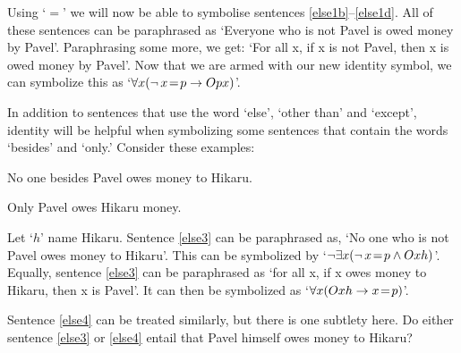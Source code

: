 Using `$=$' we will now be able to symbolise sentences \ref{else1b}--\ref{else1d}. All of these sentences can be  paraphrased as `Everyone who is not Pavel is owed money by Pavel'. Paraphrasing some more, we get: `For all x, if x is not Pavel, then x is owed money by Pavel'. Now that we are armed with our new identity symbol, we can symbolize this as `$\forall x (\neg\, x\!=\! p \rightarrow Opx)$'.

In addition to sentences that use the word `else', `other than' and `except', identity will be helpful when symbolizing some sentences that contain the words `besides' and `only.' Consider these examples:

\begin{earg}
\item[\ex{else3}] No one besides Pavel owes money to Hikaru.
\item[\ex{else4}] Only Pavel owes Hikaru money.
\end{earg}
Let `$h$' name Hikaru. Sentence \ref{else3} can be paraphrased as, `No one who is not Pavel owes money to Hikaru'. This can be symbolized by `$\neg\exists x(\neg\,x \!=\! p \wedge Oxh)$'. Equally, sentence \ref{else3} can be paraphrased as `for all x, if x owes money to Hikaru, then x is Pavel'. It can then be symbolized as `$\forall x (Oxh \rightarrow x \!=\! p)$'.

Sentence \ref{else4} can be treated similarly, but there is one subtlety here. Do either sentence \ref{else3} or \ref{else4} entail that Pavel himself owes money to Hikaru? 









